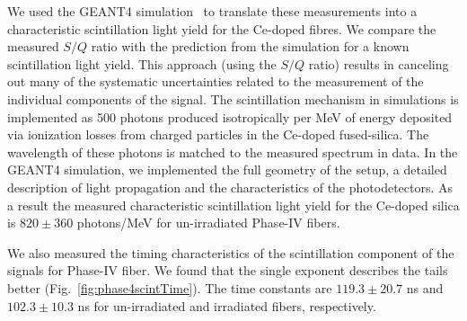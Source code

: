\documentclass[a4paper,11pt]{article}
\begin{document}
We used the GEANT4 simulation~\cite{r-GEANT4} to translate these measurements into a characteristic scintillation light yield for the Ce-doped fibres. We compare the measured $S/Q$ ratio with the prediction from the simulation for a  known scintillation light yield. This approach (using the $S/Q$ ratio) results in canceling out many of the systematic uncertainties related to the measurement of the individual components of the signal. The scintillation mechanism in simulations is implemented as 500 photons produced isotropically per MeV of energy deposited via ionization losses from charged particles in the Ce-doped fused-silica. The wavelength of these photons is  matched to the measured spectrum in data. In the GEANT4 simulation, we implemented the full geometry of the setup, a detailed description of light propagation and the characteristics of the photodetectors. 
As a result the measured characteristic scintillation light yield for the Ce-doped silica is $820\pm 360$ photons/MeV for un-irradiated Phase-IV fibers. 

We also measured the timing characteristics of the scintillation component of the signals for Phase-IV fiber. We found that the single exponent describes the tails better (Fig.~\ref{fig:phase4scintTime}). The time constants are $119.3 \pm 20.7$ ns and $102.3 \pm 10.3$ ns for un-irradiated and irradiated fibers, respectively.
\end{document}
